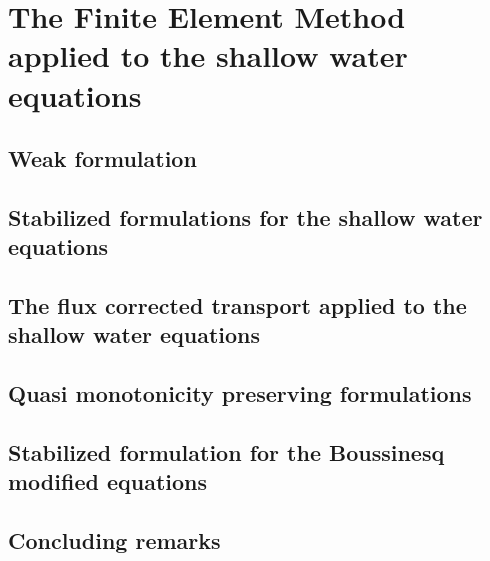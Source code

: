 
\chapter{The Finite Element Method applied to the shallow water equations}
\label{eulerian_sw}


\section{Weak formulation}


\section{Stabilized formulations for the shallow water equations}



\section{The flux corrected transport applied to the shallow water equations}



\section{Quasi monotonicity preserving formulations}



\section{Stabilized formulation for the Boussinesq modified equations}



\section{Concluding remarks}


